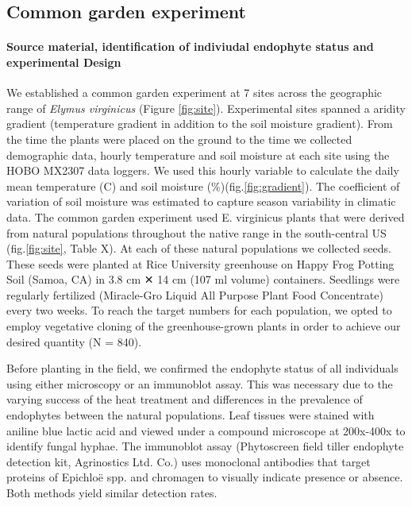\documentclass[12pt,english]{article}
\begin{document}
\begin{spacing}{1.9}
\subsection*{Common garden experiment}
\paragraph {Source material, identification of indiviudal endophyte status and experimental Design} 
We established a common garden experiment at 7 sites across the geographic range of \emph {Elymus virginicus} (Figure \ref{fig:site}). 
Experimental sites spanned a aridity gradient (temperature gradient in addition to the soil moisture gradient).
From the time the plants were placed on the ground to the time we collected demographic data, hourly temperature and soil moisture at each site using the HOBO MX2307 data loggers. 
We used this hourly variable to calculate the daily mean temperature (\degree C) and soil moisture (\%)(fig.\ref{fig:gradient}). 
The coefficient of variation of soil moisture was estimated to capture season variability in climatic data. 
The common garden experiment used E. virginicus plants that were derived from natural populations throughout the native range in the south-central US (fig.\ref{fig:site}, Table X). 
At each of these natural populations we collected seeds. 
These seeds were planted at Rice University greenhouse on Happy Frog Potting Soil (Samoa, CA) in 3.8 cm ✕ 14 cm (107 ml volume) containers.
Seedlings were regularly fertilized (Miracle-Gro Liquid All Purpose Plant Food Concentrate) every two weeks. 
To reach the target numbers for each population, we opted to employ vegetative cloning of the greenhouse-grown plants in order to achieve our desired quantity (N = 840).

Before planting in the field, we confirmed the endophyte status of all individuals using either microscopy or an immunoblot assay. This was necessary due to the varying success of the heat treatment and differences in the prevalence of endophytes between the natural populations. Leaf tissues were stained with aniline blue lactic acid and viewed under a compound microscope at 200x-400x to identify fungal hyphae. The immunoblot assay (Phytoscreen field tiller endophyte detection kit, Agrinostics Ltd. Co.) uses monoclonal antibodies that target proteins of Epichloë spp. and chromagen to visually indicate presence or absence. Both methods yield similar detection rates.  


\end{spacing}
\end{document}
